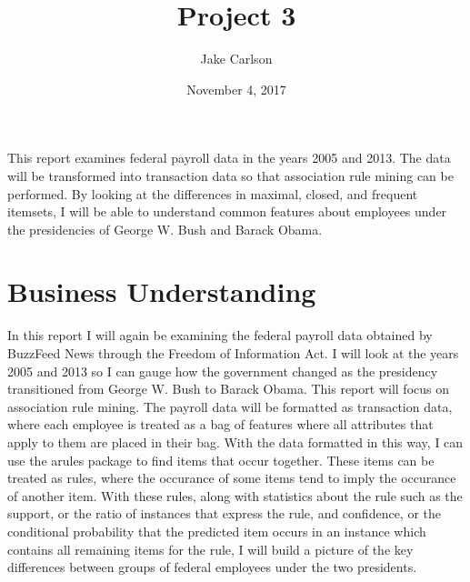 \documentclass{article}
\begin{document}
\title{Project 3}
\author{Jake Carlson}
\date{November 4, 2017}
\maketitle

\abstract
This report examines federal payroll data in the years 2005 and 2013. The data will be transformed into transaction data so that association rule mining can be performed. By looking at the differences in maximal, closed, and frequent itemsets, I will be able to understand common features about employees under the presidencies of George W. Bush and Barack Obama.

\newpage

\tableofcontents
\newpage

\section{Business Understanding}
In this report I will again be examining the federal payroll data obtained by BuzzFeed News through the Freedom of Information Act. I will look at the years 2005 and 2013 so I can gauge how the government changed as the presidency transitioned from George W. Bush to Barack Obama. This report will focus on association rule mining. The payroll data will be formatted as transaction data, where each employee is treated as a bag of features where all attributes that apply to them are placed in their bag. With the data formatted in this way, I can use the arules package to find items that occur together. These items can be treated as rules, where the occurance of some items tend to imply the occurance of another item. With these rules, along with statistics about the rule such as the support, or the ratio of instances that express the rule, and confidence, or the conditional probability that the predicted item occurs in an instance which contains all remaining items for the rule, I will build a picture of the key differences between groups of federal employees under the two presidents.
\end{document}
